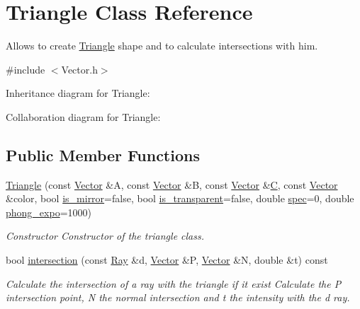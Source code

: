 \hypertarget{classTriangle}{}\section{Triangle Class Reference}
\label{classTriangle}


Allows to create \hyperlink{classTriangle}{Triangle} shape and to calculate intersections with him.  




{\ttfamily \#include $<$Vector.\+h$>$}



Inheritance diagram for Triangle\+:


Collaboration diagram for Triangle\+:
\subsection*{Public Member Functions}
\begin{DoxyCompactItemize}
\item 
\hyperlink{classTriangle_a7646770e1ed718e4a88521d15113446c}{Triangle} (const \hyperlink{classVector}{Vector} \&A, const \hyperlink{classVector}{Vector} \&B, const \hyperlink{classVector}{Vector} \&\hyperlink{classTriangle_af4a3aa7354bf229be9d4149dc800b5ee}{C}, const \hyperlink{classVector}{Vector} \&color, bool \hyperlink{classShape_a0ead7657fa5e4c7862fe1cedd670a9e5}{is\+\_\+mirror}=false, bool \hyperlink{classShape_ab8da3fc4606e66dea941ec23d25f53ef}{is\+\_\+transparent}=false, double \hyperlink{classShape_a60ef96ac5dea3478fdd1ab320e4c3bef}{spec}=0, double \hyperlink{classShape_a2556fca106f9503e6dfb4da703c28f7f}{phong\+\_\+expo}=1000)
\begin{DoxyCompactList}\small\item\em Constructor Constructor of the triangle class. \end{DoxyCompactList}\item 
bool \hyperlink{classTriangle_a3290db0f1a807905ff0293b209e32dbf}{intersection} (const \hyperlink{classRay}{Ray} \&d, \hyperlink{classVector}{Vector} \&P, \hyperlink{classVector}{Vector} \&N, double \&t) const
\begin{DoxyCompactList}\small\item\em Calculate the intersection of a ray with the triangle if it exist Calculate the P intersection point, N the normal intersection and t the intensity with the d ray. \end{DoxyCompactList}\end{DoxyCompactItemize}
